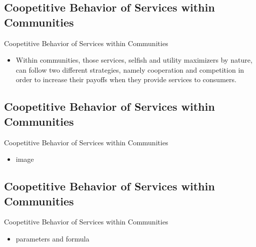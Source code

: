 \documentclass{beamer}
\begin{document}
\subsection{Coopetitive Behavior of Services within Communities}
\begin{frame}{Coopetitive Behavior of Services within Communities}
    \begin{itemize}
        \item Within communities, those services, selfish and utility maximizers by nature, can follow two different strategies, namely cooperation and competition in order to increase their payoffs when they provide services to consumers.
    \end{itemize}
\end{frame}

\subsection{Coopetitive Behavior of Services within Communities}
\begin{frame}{Coopetitive Behavior of Services within Communities}
    \begin{itemize}
        \item image
    \end{itemize}
\end{frame}

\subsection{Coopetitive Behavior of Services within Communities}
\begin{frame}{Coopetitive Behavior of Services within Communities}
    \begin{itemize}
        \item parameters and formula
    \end{itemize}
\end{frame}
\end{document}
